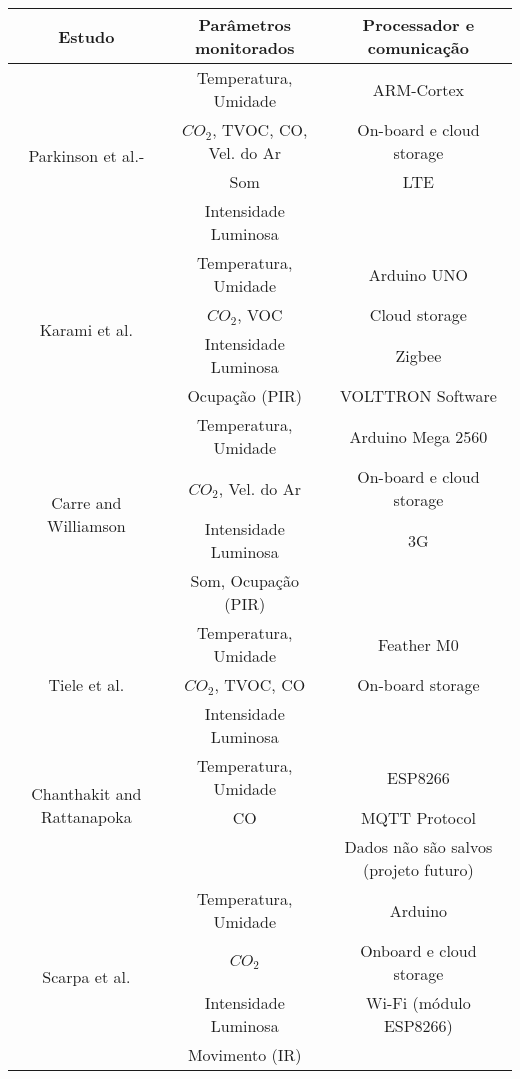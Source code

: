 \documentclass[../monografia.tex]{subfiles}
\begin{document}
\begin{center}
\begin{longtable}{ |c|c|c| } 
\hline %
\textbf{Estudo} & \textbf{Parâmetros monitorados} & \textbf{Processador e comunicação} \\ 
\hline %
\multirow{4}{8em}{Parkinson et al.\cite{PARKINSON201915}-\cite{PARKINSON2019241}} & Temperatura, Umidade & ARM-Cortex \\
& $CO_{2}$, TVOC, CO, Vel. do Ar & On-board e cloud storage \\ 
& Som & LTE \\ 
& Intensidade Luminosa  &  \\ 
\hline %
\multirow{4}{8em}{Karami et al.\cite{KARAMI2018412}} & Temperatura, Umidade & Arduino UNO \\ 
& $CO_{2}$, VOC & Cloud storage \\ 
& Intensidade Luminosa & Zigbee \\ 
& Ocupação (PIR)  & VOLTTRON Software \\ 
\hline %
\multirow{4}{8em}{Carre and Williamson\cite{CARRE20181751}} & Temperatura, Umidade & Arduino Mega 2560 \\ 
& $CO_{2}$, Vel. do Ar & On-board e cloud storage \\ 
& Intensidade Luminosa & 3G \\ 
& Som, Ocupação (PIR)  &  \\ 
\hline %
\multirow{3}{8em}{Tiele et al.\cite{Tiele2018}} & Temperatura, Umidade & Feather M0 \\ 
& $CO_{2}$, TVOC, CO & On-board storage \\ 
& Intensidade Luminosa &  \\ 
\hline %
\multirow{3}{8em}{Chanthakit and Rattanapoka\cite{Chanthakit2018}} & Temperatura, Umidade & ESP8266 \\  %
& CO & MQTT Protocol \\ 
&  & \multirow{2}{12em}{Dados não são salvos (projeto futuro)} \\ 
& & \\
\hline %
\multirow{4}{8em}{Scarpa et al.\cite{SCARPA2017282}} & Temperatura, Umidade & Arduino \\ 
& $CO_{2}$ & Onboard e cloud storage \\ 
& Intensidade Luminosa & Wi-Fi (módulo ESP8266) \\ 
& Movimento (IR)  &\\

\end{longtable}
\end{center}
\end{document}
